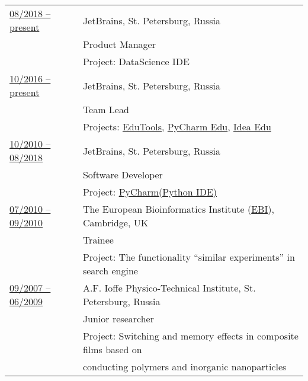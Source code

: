 \documentclass[letterpaper,11pt,oneside]{article}
\begin{document}
\noindent \begin{tabular}{@{} l l}
\underline{08/2018 -- present}    & JetBrains, St. Petersburg, Russia \\
                          			   & Product Manager  \\
                        	 		     & Project: DataScience IDE \vspace{1em} \\

 \underline{10/2016 -- present}   &  JetBrains, St. Petersburg, Russia  \\
                                  &  Team Lead \\
                                  &  Projects: \href{https://plugins.jetbrains.com/plugin/10081-edutools}{EduTools}, 
                                  \href{https://www.jetbrains.com/education/#lang=python&role=learner}{PyCharm Edu}, 
                                  \href{https://www.jetbrains.com/education/#lang=java&lang=kotlin&lang=scala&role=learner}{Idea Edu} \vspace{1em} \\

\underline{10/2010 -- 08/2018}    & JetBrains, St. Petersburg, Russia \\
                          			   & Software Developer  \\
                        	 		     & Project: \href{https://www.jetbrains.com/pycharm/}{PyCharm(Python IDE)} \vspace{1em} \\
                        	 		     
\underline{07/2010 -- 09/2010}    & The European Bioinformatics Institute (\href{https://www.ebi.ac.uk/}{EBI}), Cambridge, UK \\
                          		  	   & Trainee \\
                    		           & Project: The functionality “similar experiments” in search engine \vspace{1em} \\

\underline{09/2007 -- 06/2009}    & A.F. Ioffe Physico-Technical Institute, St. Petersburg, Russia \\
                                  & Junior researcher \\
                          			   & Project: Switching and memory effects in composite films based on \\ 
                          			   & conducting polymers and inorganic nanoparticles \vspace{1em} \\


\end{tabular}
\end{document}
